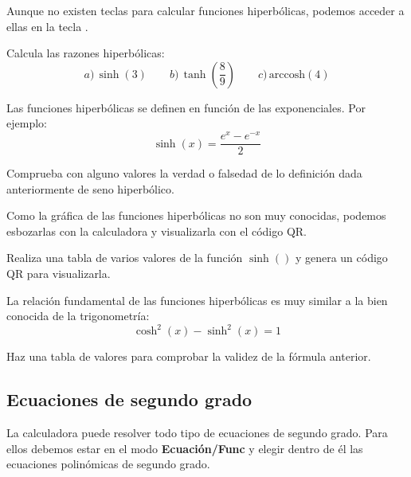 \documentclass[12pt]{article}
\newcommand{\casiosymbol}[1]{{\footnotesize\casio\symbol{#1}}}
\newenvironment{capitulo}{\begin{tcolorbox}[colback=blue!5!white,colframe=red!75!black]}{\end{tcolorbox}\bigskip}
\newenvironment{ejer}{\begin{tcolorbox}[center title, 
fonttitle=\sffamily\bfseries,colback=blue!5,colframe=orange]}{\end{tcolorbox}}
\begin{document}
Aunque no existen teclas para calcular funciones hiperbólicas, podemos acceder a ellas en la tecla \casiosymbol{84}.

\begin{ejer}

Calcula las razones hiperbólicas:
\[
a)\,\sinh(3) \qquad b)\, \tanh\left(\frac{8}{9}\right) \qquad c)\,\mathrm{arccosh}(4)
\]

\end{ejer}

Las funciones hiperbólicas se definen en función de las exponenciales. Por ejemplo:
\[
\sinh(x) = \frac{e^x-e^{-x}}{2}
\]

\begin{ejer}

Comprueba con alguno valores la verdad o falsedad de lo definición dada anteriormente de seno hiperbólico.

\end{ejer}

Como la gráfica de las funciones hiperbólicas no son muy conocidas, podemos esbozarlas con la calculadora y visualizarla con el código QR.

\begin{ejer}

Realiza una tabla de varios valores de la función $\sinh()$ y genera un código QR para visualizarla.

\end{ejer}

La relación fundamental de las funciones hiperbólicas es muy similar a la bien conocida de la trigonometría:
\[
\cosh^2(x)-\sinh^2(x)=1
\]

\begin{ejer}

Haz una tabla de valores para comprobar la validez de la fórmula anterior.
\end{ejer}



\newpage

\begin{capitulo}
\section*{Ecuaciones de segundo grado}
\end{capitulo}

La calculadora puede resolver todo tipo de ecuaciones de segundo grado. Para ellos debemos estar en el modo \textbf{Ecuación/Func} y elegir dentro de él las ecuaciones polinómicas de segundo grado.
\end{document}
